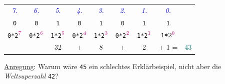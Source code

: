\begin{frame}[fragile]
\begin{footnotesize}
  \renewcommand{\arraystretch}{1.5}
    \begin{tabular}{c c c c c c c c c}
    \textit{\textcolor{blue}{7.}} &\textit{\textcolor{blue}{6.}} &
      \textit{\textcolor{blue}{5.}} & \textit{\textcolor{blue}{4.}} &
        \textit{\textcolor{blue}{3.}} & \textit{\textcolor{blue}{2.}} &
          \textit{\textcolor{blue}{1.}} & \textit{\textcolor{blue}{0.}} & \\
      \texttt{0} & \texttt{0} & \texttt{1} & \texttt{0} & \texttt{1} & \texttt{0} & \texttt{1} & \texttt{1} & \\
      \texttt{0*2}$\mathcolor{magenta}{^7}$ & \texttt{0*2}$\mathcolor{magenta}{^6}$ & 
        \texttt{1*2}$\mathcolor{magenta}{^5}$ & \texttt{0*2}$\mathcolor{magenta}{^4}$ & 
         \texttt{1*2}$\mathcolor{magenta}{^3}$ & \texttt{0*2}$\mathcolor{magenta}{^2}$ & 
           \texttt{1*2}$\mathcolor{magenta}{^1}$ & $\texttt{1*2}\mathcolor{magenta}{^0}$ & \\
      & & 32 & + & 8 & + & 2 & + 1 = & \textcolor{teal}{43} \\
   \end{tabular}
  \end{footnotesize}

  \vspace{0.5cm}
  \tiny{\underline{Anregung}: Warum wäre \texttt{45} ein schlechtes Erklärbeispiel, nicht aber die \textit{Weltsuperzahl} \texttt{42}?}
\end{frame}


